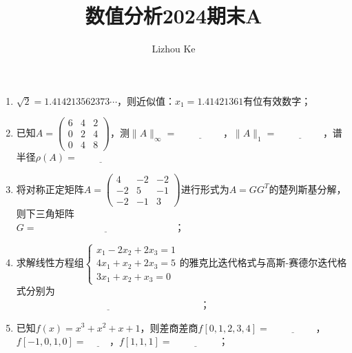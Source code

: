 \documentclass[12pt,a4paper]{article}
\title{数值分析2024期末A}
\author{Lizhou Ke}
\date{}
\begin{document}
	
\maketitle

\begin{enumerate}
    \item $\sqrt{2} = 1.414213562373 \cdots$，则近似值：$x_1 = 1.41421361$有\underline{\hspace{2cm}}位有效数字；
    
    \item 已知$A = \begin{pmatrix}
        6 & 4 & 2 \\
        0 & 2 & 4 \\
        0 & 4 & 8
    \end{pmatrix}$，测$\|A\|_\infty = \underline{\hspace{2cm}}$，$\|A\|_1 = \underline{\hspace{2cm}}$，谱半径$\rho(A) = \underline{\hspace{2cm}}$
    
    \item 将对称正定矩阵$A = \begin{pmatrix}
        4 & -2 & -2 \\
        -2 & 5 & -1 \\
        -2 & -1 & 3
    \end{pmatrix}$进行形式为$A = GG^T$的楚列斯基分解，则下三角矩阵\\
    $G = \underline{\hspace{6cm}}$；
    
    \item 求解线性方程组$\begin{cases}
        x_1 - 2x_2 + 2x_3 = 1 \\
        4x_1 + x_2 + 2x_3 = 5 \\
        3x_1 + x_2 + x_3 = 0
    \end{cases}$的雅克比迭代格式与高斯-赛德尔迭代格式分别为\\
    $\underline{\hspace{8cm}}$；
    
    \item 已知$f(x) = x^3 + x^2 + x + 1$，则差商差商$f[0,1,2,3,4] = \underline{\hspace{2cm}}$，\\
    $f[-1,0,1,0] = \underline{\hspace{1cm}}$，$f[1,1,1] = \underline{\hspace{2cm}}$；
    

\end{enumerate}
\end{document}
